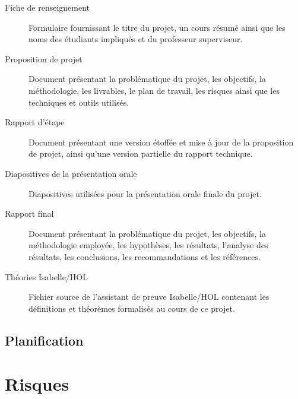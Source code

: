 \documentclass[a4paper, oneside, 12pt, titlepage, draft]{article}
\begin{document}

\begin{description}
  \item[Fiche de renseignement]
    Formulaire fournissant le titre du projet, un cours résumé ainsi que les noms des étudiants
    impliqués et du professeur superviseur.
  \item[Proposition de projet]
    Document présentant la problématique du projet, les objectifs, la méthodologie, les livrables,
    le plan de travail, les risques ainsi que les techniques et outils utilisés.
  \item[Rapport d'étape]
    Document présentant une version étoffée et mise à jour de la proposition de projet, ainsi qu'une
    version partielle du rapport technique.
  \item[Diapositives de la présentation orale]
    Diapositives utilisées pour la présentation orale finale du projet.
  \item[Rapport final]
    Document présentant la problématique du projet, les objectifs, la méthodologie employée, les
    hypothèses, les résultats, l'analyse des résultats, les conclusions, les recommandations et les
    références.
  \item[Théories Isabelle/HOL]
    Fichier source de l'assistant de preuve Isabelle/HOL contenant les définitions et théorèmes
    formalisés au cours de ce projet.
\end{description}

\subsection{Planification}


\section{Risques}

\end{document}
